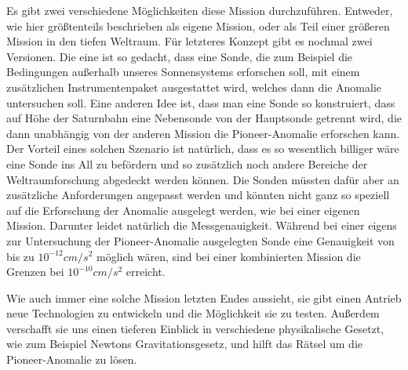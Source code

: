Es gibt zwei verschiedene M\"oglichkeiten diese Mission durchzuf\"uhren.
Entweder, wie hier gr\"o{\ss}tenteils beschrieben als eigene Mission,
oder als Teil einer gr\"o{\ss}eren Mission in den tiefen Weltraum.
F\"ur letzteres Konzept gibt es nochmal zwei Versionen. Die eine ist so
ge\-dacht, dass eine Sonde, die zum Beispiel die Bedingungen
au{\ss}erhalb unseres Sonnensys\-tems erforschen soll, mit einem
zus\"atzlichen Instrumentenpaket ausgestattet wird, welches dann die
Anomalie untersuchen soll. Eine anderen Idee ist, dass man eine Sonde
so kon\-struiert, dass auf H\"ohe der Saturnbahn eine Nebensonde von
der Hauptsonde getrennt wird, die dann unabh\"angig von der anderen
Mission die Pioneer-Anomalie erforschen kann. Der Vorteil eines solchen
Szenario ist nat\"urlich, dass es so wesentlich billiger w\"are eine
Sonde ins All zu bef\"ordern und so zus\"atzlich noch andere Bereiche
der Weltraumforschung abgedeckt werden k\"onnen. Die Sonden m\"ussten
daf\"ur aber an zus\"atzliche Anforderungen angepasst werden und
k\"onnten nicht ganz so speziell auf die Erforschung der Anomalie
ausgelegt werden, wie bei einer eigenen Mission. Darunter leidet
nat\"urlich die Messgenauigkeit. W\"ahrend bei einer eigens zur
Untersuchung der Pioneer-Anomalie ausgelegten Sonde eine Genauigkeit
von bis zu  $10^{-12}\mathit{cm}/s^{2}$ m\"oglich w\"aren, sind bei
einer kombinierten Mission die Grenzen bei  $10^{-10}\mathit{cm}/s^{2}$
erreicht.


\bigskip

Wie auch immer eine solche Mission letzten Endes aussieht, sie gibt
einen Antrieb neue Technologien zu entwickeln und die M\"oglichkeit sie
zu testen. Au{\ss}erdem verschafft sie uns einen tieferen Einblick in
verschiedene physikalische Gesetzt, wie zum Beispiel Newtons
Gravitationsgesetz, und hilft das R\"atsel um die Pioneer-Anomalie zu
l\"osen.
